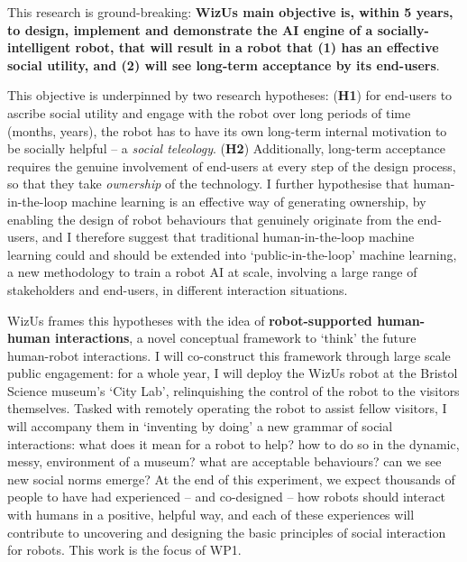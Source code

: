 \documentclass[11pt,a4paper]{report}
\newcommand{\project}{WizUs\xspace}
\begin{document}
This research is ground-breaking: \textbf{\project main objective is, within 5
years, to design, implement and demonstrate the AI engine of a
socially-intelligent robot, that will result in a robot that (1) has an
effective social utility, and (2) will see long-term acceptance by its
end-users}.

This objective is underpinned by two research hypotheses: (\textbf{H1}) for
end-users to ascribe social utility and engage with the robot over long periods
of time (months, years), the robot has to have its own long-term internal
motivation to be socially helpful -- a \emph{social teleology}. (\textbf{H2})
Additionally, long-term acceptance requires the genuine involvement of end-users
at every step of the design process, so that they take \emph{ownership} of the
technology. I further hypothesise that human-in-the-loop machine learning is an
effective way of generating ownership, by enabling the design of robot
behaviours that genuinely originate from the end-users, and I therefore suggest
that traditional human-in-the-loop machine learning could and should be extended
into `public-in-the-loop' machine learning, a new methodology to train a robot
AI at scale, involving a large range of stakeholders and end-users, in different
interaction situations.






\project frames this hypotheses with the idea of \textbf{robot-supported
human-human interactions}, a novel conceptual framework to `think' the future
human-robot interactions. I will co-construct this framework through large scale
public engagement: for a whole year, I will deploy the \project robot at the
Bristol Science museum's `City Lab', relinquishing the control of the robot to
the visitors themselves. Tasked with remotely operating the robot to assist
fellow visitors, I will accompany them in `inventing by doing' a new grammar of
social interactions: what does it mean for a robot to help? how to do so in the
dynamic, messy, environment of a museum? what are acceptable behaviours? can we
see new social norms emerge? At the end of this experiment, we expect thousands
of people to have had experienced -- and co-designed -- how robots should
interact with humans in a positive, helpful way, and each of these experiences
will contribute to uncovering and designing the basic principles of social
interaction for robots. This work is the focus of WP1.
\end{document}
